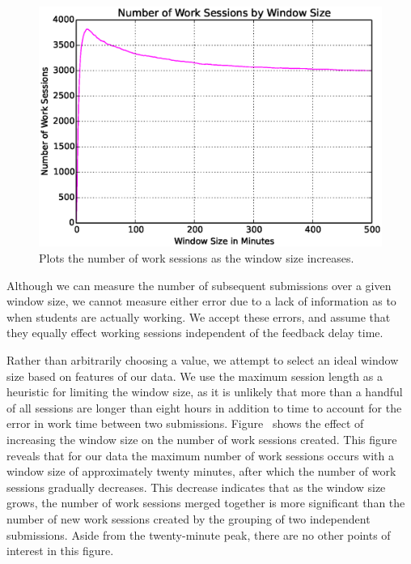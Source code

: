 \begin{figure}[!t]
\centering
\includegraphics[width=5.25in]{graphs/Number_of_Work_Sessions_by_Window_Size.eps}
\caption{Plots the number of work sessions as the window size increases.}
\end{figure}

Although we can measure the number of subsequent submissions over a given
window size, we cannot measure either error due to a lack of information as to
when students are actually working. We accept these errors, and assume that
they equally effect working sessions independent of the feedback delay
time.

Rather than arbitrarily choosing a value, we attempt to select an ideal window
size based on features of our data. We use the maximum session length as a
heuristic for limiting the window size, as it is unlikely that more than a
handful of all sessions are longer than eight hours in addition to time to
account for the error in work time between two
submissions. Figure~ shows the effect of increasing
the window size on the number of work sessions created. This figure reveals
that for our data the maximum number of work sessions occurs with a window size
of approximately twenty minutes, after which the number of work sessions
gradually decreases. This decrease indicates that as the window size grows, the
number of work sessions merged together is more significant than the number of
new work sessions created by the grouping of two independent submissions. Aside
from the twenty-minute peak, there are no other points of interest in this
figure.


